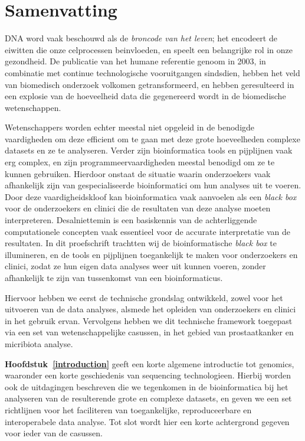 \chapter{Samenvatting}

DNA word vaak beschouwd als de \emph{broncode van het leven}; het encodeert
de eiwitten die onze celprocessen beinvloeden, en speelt een belangrijke rol in onze gezondheid.
De publicatie van het humane referentie genoom in 2003, in combinatie met continue technologische vooruitgangen sindsdien, hebben het veld van biomedisch onderzoek volkomen getransformeerd, en hebben geresulteerd in een explosie van de hoeveelheid data die gegenereerd wordt in de biomedische wetenschappen.

Wetenschappers worden echter meestal niet opgeleid in de benodigde vaardigheden om deze efficient om te gaan met deze grote hoeveelheden complexe datasets en ze te analyseren.
Verder zijn bioinformatica tools en pijplijnen vaak erg complex, en zijn programmeervaardigheden meestal benodigd om ze te kunnen gebruiken. Hierdoor onstaat de situatie waarin onderzoekers vaak afhankelijk zijn van gespecialiseerde bioinformatici om hun analyses uit te voeren.
Door deze vaardigheidskloof kan bioinformatica vaak aanvoelen als een \emph{black box} voor de onderzoekers en clinici die de resultaten van deze analyse moeten interpreteren.
Desalniettemin is een basiskennis van de achterliggende computationele concepten vaak essentieel voor de accurate interpretatie van de resultaten.
In dit proefschrift trachtten wij de bioinformatische \emph{black box} te illumineren, en de tools en pijplijnen toegankelijk te maken voor onderzoekers en clinici, zodat ze hun eigen data analyses weer uit kunnen voeren, zonder afhankelijk te zijn van tussenkomst van een bioinformaticus.

Hiervoor hebben we eerst de technische grondslag ontwikkeld, zowel voor het uitvoeren van de data analyses, alsmede het opleiden van onderzoekers en clinici in het gebruik ervan. Vervolgens hebben we dit technische framework toegepast via een set van wetenschappelijke casussen, in het gebied van prostaatkanker en micribiota analyse.

\textbf{Hoofdstuk~\ref{introduction}} geeft een korte algemene introductie tot genomics, waaronder een korte geschiedenis van sequencing technologieen.
Hierbij worden ook de uitdagingen beschreven die we tegenkomen in de bioinformatica bij het analyseren van de resulterende grote en complexe datasets, en geven we een set richtlijnen voor het faciliteren van toegankelijke, reproduceerbare en interoperabele data analyse.
Tot slot wordt hier een korte achtergrond gegeven voor ieder van de casussen.

